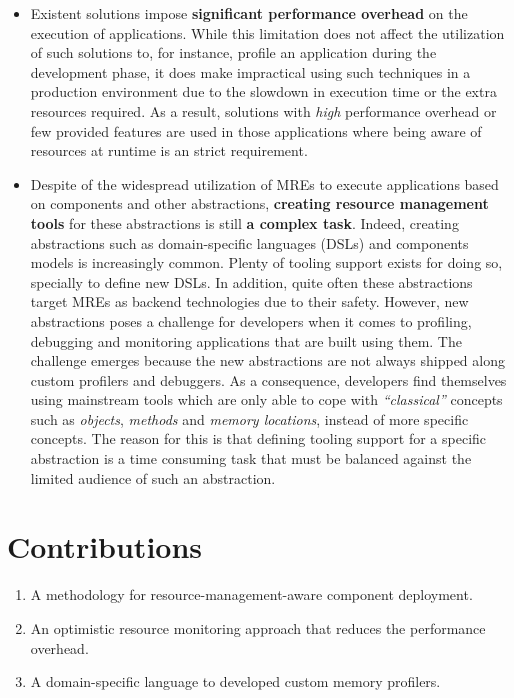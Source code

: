 \begin{itemize}
\item Existent solutions impose \textbf{significant performance overhead} on the execution of applications.
While this limitation does not affect the utilization of such solutions to, for instance, profile an application during the development phase, it does make impractical using such techniques in a production environment due to the slowdown in execution time or the extra resources required.
As a result, solutions with \textit{high} performance overhead or few provided features are used in those applications where being aware of resources at runtime is an strict requirement.

\item Despite of the widespread utilization of MREs to execute applications based on components and other abstractions, \textbf{creating resource management tools} for these abstractions is still \textbf{a complex task}.
Indeed, creating abstractions such as domain-specific languages (DSLs) and components models is increasingly common.
Plenty of tooling support exists for doing so, specially to define new DSLs.
In addition, quite often these abstractions target MREs as backend technologies due to their safety.
However, new abstractions poses a challenge for developers when it comes to profiling, debugging and monitoring applications that are built using them.
The challenge emerges because the new abstractions are not always shipped along custom profilers and debuggers.
As a consequence, developers find themselves using mainstream tools which are only able to cope with \textit{``classical''} concepts such as \textit{objects}, \textit{methods} and \textit{memory locations}, instead of more specific concepts.
The reason for this is that defining tooling support for a specific abstraction is a time consuming task that must be balanced against the limited audience of such an abstraction.
\end{itemize}
 
\section{Contributions}

\begin{enumerate}
\item A methodology for resource-management-aware component deployment.
\item An optimistic resource monitoring approach that reduces the performance overhead.
\item A domain-specific language to developed custom memory profilers.
\end{enumerate}
